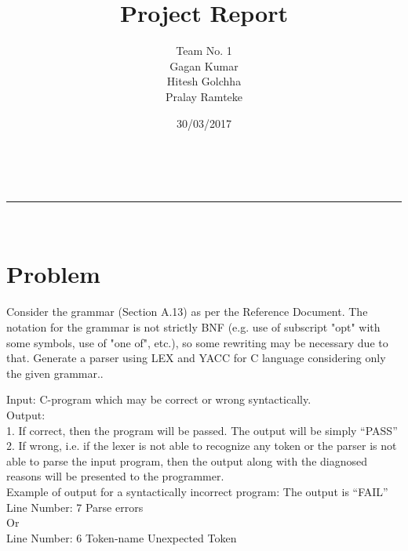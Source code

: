 \documentclass[a4paper,11pt]{article}
\makeatletter
\newcommand{\linia}{\rule{\linewidth}{0.5pt}}
\theoremstyle{mytheor}
\renewcommand{\maketitle}{
\begin{center}
\vspace{2ex}
{\huge \textsc{\@title}}
\vspace{1ex}
\\
\linia\\
\@author \hfill \@date
\vspace{4ex}
\end{center}
}
\makeatother
\begin{document}
\title{Project Report }

\author{ Team No. 1 \\ Gagan Kumar  \\ Hitesh Golchha \\ Pralay Ramteke \\ }

\date{30/03/2017}

\maketitle

\section*{Problem}

Consider the grammar (Section A.13) as per the Reference Document. 
The notation for the grammar is not strictly BNF (e.g. use of subscript "opt" with some symbols, use of "one of", etc.), so some rewriting may be necessary due to that.
Generate a parser using LEX and YACC for C language considering only the given grammar..

Input: C-program which may be correct or wrong syntactically.  \\ 
Output: \\
1. If correct, then the program will be passed. The output will be simply “PASS” \\
2. If wrong, i.e. if the lexer is not able to recognize any token or the parser is not able to parse the input program, then the output along with the diagnosed reasons will be presented to the programmer. \\

Example of output for a syntactically incorrect program: The output is “FAIL” \\
Line Number: 7 Parse errors \\
Or \\ 
Line Number: 6 Token-name Unexpected Token \\
\end{document}
